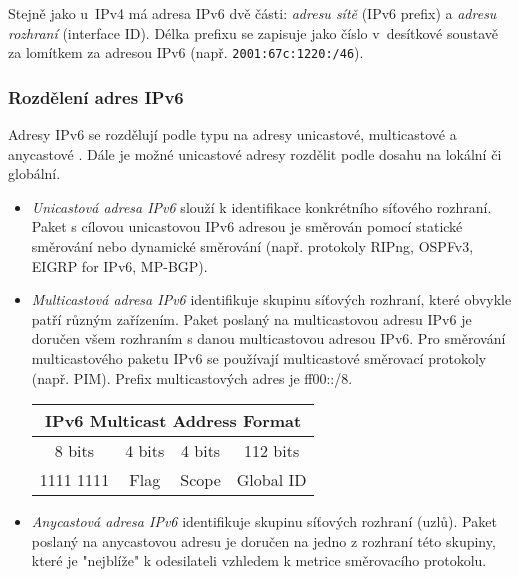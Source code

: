 Stejně jako u~IPv4 má adresa IPv6 dvě části: \emph{adresu sítě} (IPv6 prefix) a
\emph{adresu rozhraní} (interface ID). Délka prefixu se zapisuje jako číslo v~desítkové soustavě za lomítkem za adresou IPv6 (např. {\tt 2001:67c:1220:/46}).

\subsubsection{Rozdělení adres IPv6}
Adresy IPv6 se rozdělují podle typu na adresy unicastové, multicastové a anycastové \cite{rfc4291}. Dále je možné unicastové adresy rozdělit podle dosahu na lokální či globální.

\begin{itemize}
  \item {\em Unicastová adresa IPv6} slouží k identifikace konkrétního síťového rozhraní. Paket s cílovou unicastovou IPv6 adresou je směrován pomocí statické směrování nebo dynamické směrování (např. protokoly RIPng, OSPFv3, EIGRP for IPv6, MP-BGP).
  \item {\em Multicastová adresa IPv6} identifikuje skupinu síťových rozhraní, které obvykle patří různým zařízením. Paket poslaný na multicastovou adresu IPv6 je doručen všem rozhraním s danou multicastovou adresou IPv6. Pro směrování multicastového paketu IPv6 se používají multicastové směrovací protokoly (např. PIM). Prefix multicastových adres je ff00::/8.

    \begin{table}[h]
      \begin{center}
        \begin{tabular}{|c|c|c|c|}
          \multicolumn{4}{c}{IPv6 Multicast Address Format}\\
          \hline
          8 bits & 4 bits &  4 bits  &  112 bits \\
          \hline
          1111 1111 & Flag & Scope & Global ID \\
          \hline
        \end{tabular}
      \end{center}
    \end{table}


  \item {\em Anycastová adresa IPv6} identifikuje skupinu síťových rozhraní (uzlů). Paket poslaný na anycastovou adresu je doručen na jedno z rozhraní této skupiny, které je "nejblíže" k odesilateli vzhledem k metrice směrovacího protokolu.
\end{itemize}

